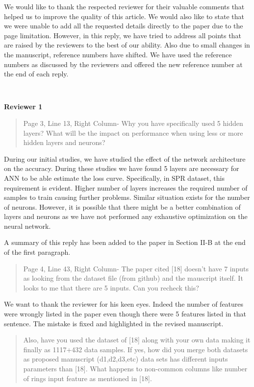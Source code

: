 \documentclass{article}
\begin{document}
	We would like to thank the respected reviewer for their valuable comments that helped us to improve the quality of this article. We would also like to state that we were unable to add all the requested details directly to the paper due to the page limitation. However, in this reply, we have tried to address all points that are raised by the reviewers to the best of our ability. Also due to small changes in the manuscript, reference numbers have shifted. We have used the reference numbers as discussed by the reviewers and offered the new reference number at the end of each reply.
	
	~
	
	{\bfseries\large Reviewer 1}
	
	\begin{quote}
	Page 3, Line 13, Right Column- Why you have specifically used 5 hidden layers? What will be the impact on performance when using less or more hidden layers and neurons?
	\end{quote}
	
	During our initial studies, we have studied the effect of the network architecture on the accuracy. During these studies we have found 5 layers are necessary for ANN to be able estimate the loss curve. Specifically, in SPR dataset, this requirement is evident. Higher number of layers increases the required number of samples to train causing further problems. Similar situation exists for the number of neurons. However, it is possible that there might be a better combination of layers and neurons as we have not performed any exhaustive optimization on the neural network.
	
	A summary of this reply has been added to the paper in Section II-B at the end of the first paragraph.
	
	\begin{quote}
	Page 4, Line 43, Right Column- The paper cited [18] doesn't have 7 inputs as looking from the dataset file (from github) and the mauscript itself. It looks to me that there are 5 inputs. Can you recheck this?
	\end{quote}
	
	We want to thank the reviewer for his keen eyes. Indeed the number of features were wrongly listed in the paper even though there were 5 features listed in that sentence. The mistake is fixed and highlighted in the revised manuscript.
	
	\begin{quote}
	Also, have you used the dataset of [18] along with your own data making it finally as 1117+432 data samples. If yes, how did you merge both datasets as proposed manuscript (d1,d2,d3,etc) data sets has different inputs parameters than [18]. What happens to non-common columns like number of rings input feature as mentioned in [18].
	\end{quote}
	
\end{document}

